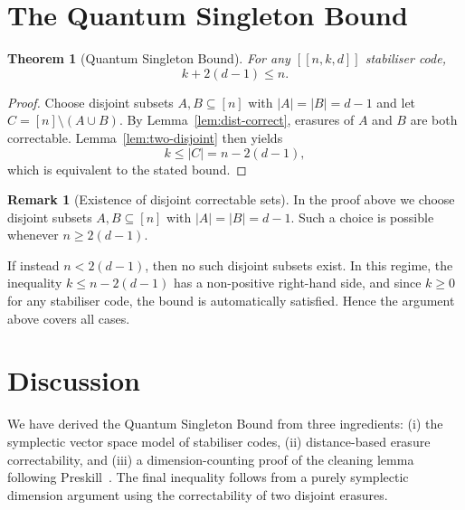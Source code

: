 \documentclass[11pt]{article}
\theoremstyle{plain}
\newtheorem{theorem}{Theorem}
\theoremstyle{definition}
\newtheorem{remark}{Remark}
\begin{document}
\section{The Quantum Singleton Bound}\label{sec:singleton}

\begin{theorem}[Quantum Singleton Bound]\label{thm:QSB}
For any $[[n, k, d]]$ stabiliser code,
\[
  k + 2(d-1) \le n.
\]
\end{theorem}

\begin{proof}
Choose disjoint subsets $A, B \subseteq [n]$ with $|A| = |B| = d - 1$ and let
$C = [n] \setminus (A \cup B)$.  By Lemma~\ref{lem:dist-correct}, erasures of $A$ and $B$
are both correctable.  Lemma~\ref{lem:two-disjoint} then yields
\[
  k \le |C| = n - 2(d-1),
\]
which is equivalent to the stated bound.
\end{proof}

\begin{remark}[Existence of disjoint correctable sets]
In the proof above we choose disjoint subsets $A, B \subseteq [n]$ with $|A| = |B| = d - 1$.
Such a choice is possible whenever $n \ge 2(d-1)$.

If instead $n < 2(d-1)$, then no such disjoint subsets exist.  In this regime, the inequality
$k \le n - 2(d-1)$ has a non-positive right-hand side, and since $k \ge 0$ for any stabiliser
code, the bound is automatically satisfied.  Hence the argument above covers all cases.
\end{remark}


\section{Discussion}\label{sec:discussion}

We have derived the Quantum Singleton Bound from three ingredients: (i) the symplectic vector
space model of stabiliser codes, (ii) distance-based erasure correctability, and (iii) a
dimension-counting proof of the cleaning lemma following
Preskill~\cite{Preskill2022TopologicalStabilizerCodes}.  The final inequality follows from a
purely symplectic dimension argument using the correctability of two disjoint erasures.
\end{document}
